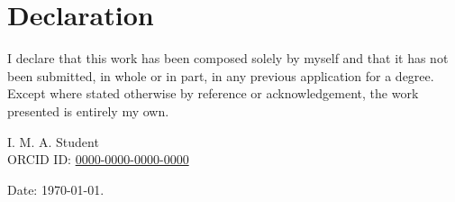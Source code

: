 \chapter*{Declaration}
\thispagestyle{empty}
I declare that this work has been composed solely by myself and that it has not been submitted, in whole or in part, in any previous application for a degree. Except where stated otherwise by reference or acknowledgement, the work presented is entirely my own.

\vspace{3ex}


\vspace{3ex}

I. M. A. Student   \\
ORCID ID: \href{https://orcid.org/0000-0000-0000-0000}{0000-0000-0000-0000}

\vspace{3ex}

Date: \britishdate\today.

\let\mainmatterreal\mainmatter
\let\mainmatter\relax